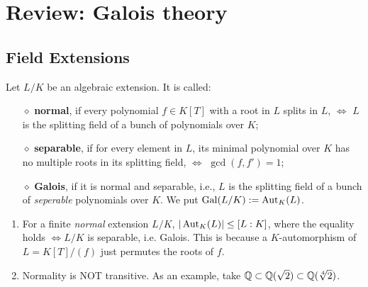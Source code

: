 \section{Review: Galois theory}
\subsection{Field Extensions}
Let $L/K$ be an algebraic extension. It is called: \begin{enumerate}
    \item [$\diamond$]\textbf{normal}, if every polynomial $f\in K[T]$ with a root in $L$ splits in $L$, $\iff$ $L$ is the splitting field of a bunch of polynomials over $K$;
    \item [$\diamond$]\textbf{separable}, if for every element in $L$, its minimal polynomial over $K$ has no multiple roots in its splitting field, $\iff$ $\gcd(f, f') = 1$;
    \item [$\diamond$]\textbf{Galois}, if it is normal and separable, i.e., $L$ is the splitting field of a bunch of \textit{seperable} polynomials over $K$. We put $\operatorname{Gal}(L/K) := \operatorname{Aut}_K(L)$.
\end{enumerate}
\begin{remark} {}
\begin{enumerate}
    \item For a finite \textit{normal} extension $L/K$, $|\operatorname{Aut}_K(L)| \le [L:K]$, where the equality holds $\iff L/K$ is separable, i.e. Galois. This is because a $K$-automorphism of $L = K[T]/(f)$ just permutes the roots of $f$.
    \item Normality is NOT transitive. As an example, take $\mathbb{Q}\subset\mathbb{Q}(\sqrt{2})\subset\mathbb{Q}(\sqrt[4]{2})$.
\end{enumerate} 
\end{remark}

